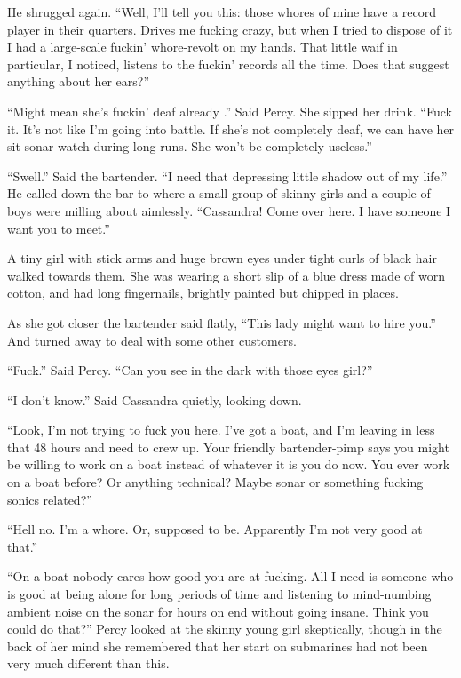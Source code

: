 \documentclass[
]{scrbook}
\begin{document}
He shrugged again. ``Well, I'll tell you this: those whores of mine have
a record player in their quarters. Drives me fucking crazy, but when I
tried to dispose of it I had a large-scale fuckin' whore-revolt on my
hands. That little waif in particular, I noticed, listens to the fuckin'
records all the time. Does that suggest anything about her ears?''

``Might mean she's fuckin' deaf already .'' Said Percy. She sipped her
drink. ``Fuck it. It's not like I'm going into battle. If she's not
completely deaf, we can have her sit sonar watch during long runs. She
won't be completely useless.''

``Swell.'' Said the bartender. ``I need that depressing little shadow
out of my life.'' He called down the bar to where a small group of
skinny girls and a couple of boys were milling about aimlessly.
``Cassandra! Come over here. I have someone I want you to meet.''

A tiny girl with stick arms and huge brown eyes under tight curls of
black hair walked towards them. She was wearing a short slip of a blue
dress made of worn cotton, and had long fingernails, brightly painted
but chipped in places.

As she got closer the bartender said flatly, ``This lady might want to
hire you.'' And turned away to deal with some other customers.

``Fuck.'' Said Percy. ``Can you see in the dark with those eyes girl?''

``I don't know.'' Said Cassandra quietly, looking down.

``Look, I'm not trying to fuck you here. I've got a boat, and I'm
leaving in less that 48 hours and need to crew up. Your friendly
bartender-pimp says you might be willing to work on a boat instead of
whatever it is you do now. You ever work on a boat before? Or anything
technical? Maybe sonar or something fucking sonics related?''

``Hell no. I'm a whore. Or, supposed to be. Apparently I'm not very good
at that.''

``On a boat nobody cares how good you are at fucking. All I need is
someone who is good at being alone for long periods of time and
listening to mind-numbing ambient noise on the sonar for hours on end
without going insane. Think you could do that?'' Percy looked at the
skinny young girl skeptically, though in the back of her mind she
remembered that her start on submarines had not been very much different
than this.
\end{document}
